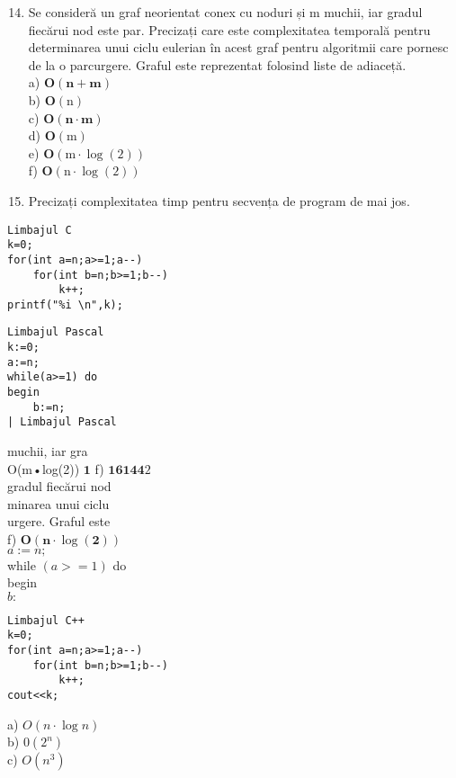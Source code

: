 \begin{enumerate}
  \setcounter{enumi}{13}
  \item Se consideră un graf neorientat conex cu noduri și m muchii, iar gradul fiecărui nod este par. Precizați care este complexitatea temporală pentru determinarea unui ciclu eulerian în acest graf pentru algoritmii care pornesc de la o parcurgere. Graful este reprezentat folosind liste de adiaceță.\\
a) $\mathbf{O}(\mathbf{n}+\mathbf{m})$\\
b) $\mathbf{O}(\mathrm{n})$\\
c) $\mathbf{O}(\mathbf{n} \cdot \mathbf{m})$\\
d) $\mathbf{O}(\mathrm{m})$\\
e) $\mathbf{O}(\mathrm{m} \cdot \log (2))$\\
f) $\mathbf{O}(\mathrm{n} \cdot \log (2))$
  \item Precizați complexitatea timp pentru secvența de program de mai jos.
\end{enumerate}

\begin{verbatim}
Limbajul C
k=0;
for(int a=n;a>=1;a--)
    for(int b=n;b>=1;b--)
        k++;
printf("%i \n",k);
\end{verbatim}

\begin{verbatim}
Limbajul Pascal
k:=0;
a:=n;
while(a>=1) do
begin
    b:=n;
| Limbajul Pascal
\end{verbatim}

muchii, iar gra\\
O(m•log(2)) $\mathbf{1}$ f) $\mathbf{1 6 1 4 4} 2$\\
gradul fiecărui nod\\
minarea unui ciclu\\
urgere. Graful este\\
f) $\mathbf{O}(\mathbf{n} \cdot \log (\mathbf{2}))$\\
$a:=n ;$\\
while $(a>=1)$ do\\
begin\\
$b:$

\begin{verbatim}
Limbajul C++
k=0;
for(int a=n;a>=1;a--)
    for(int b=n;b>=1;b--)
        k++;
cout<<k;
\end{verbatim}

a) $O(n \cdot \log n)$\\
b) $0\left(2^{n}\right)$\\
c) $O\left(n^{3}\right)$

